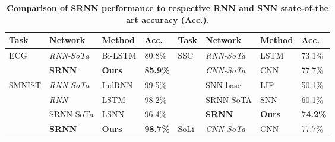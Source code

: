 \documentclass[fleqn,10pt]{wlscirep}
\begin{document}
\begin{table}[]
\centering
\caption{\textbf{Comparison of SRNN performance to respective RNN and SNN state-of-the art accuracy (Acc.).}}
\begin{tabular}{|l|l|l|l|l|l|l|l|}
\hline
Task                     & Network                                & Method                                          & Acc.                                  & Task                   & Network                                                       & Method                                                    & Acc.                                                     \\ \hline
\multirow{2}{*}{ECG}     & \em RNN-SoTa            & Bi-LSTM                                         & 80.8\%                                   & \multirow{5}{*}{SSC}   & \em  RNN-SoTa                                  & LSTM\cite{cramer2019heidelberg}          & 73.1\%                                                       \\ \cline{2-4} \cline{6-8} 
                         & \cellcolor{green}\bf SRNN & \cellcolor{green}\bf Ours          & \cellcolor{green}\bf 85.9\%  &                        & \em CNN-SoTa                                   & CNN\cite{cramer2019heidelberg}           & 77.7\%                                                       \\ \cline{1-4} \cline{6-8} 
\multirow{4}{*}{SMNIST}  & \em RNN-SoTa            & IndRNN\cite{li2018independently}        & 99.5\%                                   &                        & SNN-base                                                      & LIF \cite{cramer2019heidelberg}          & 50.1\%                                                      \\ \cline{2-4} \cline{6-8} 
                         & \em RNN                 & LSTM\cite{arjovsky2016unitary} & 98.2\%                                    &                        & SRNN-SoTA                        &      SNN\cite{perez2021neural}               & 60.1\%                      \\ \cline{2-4} \cline{6-8} 
                         & SRNN-SoTa                              & LSNN\cite{bellec2018long}      & 96.4\%                                    &                        &\cellcolor{green}\bf SRNN                        & \cellcolor{green}\bf Ours                    & \cellcolor{green}\bf 74.2\%                                                              \\ \cline{2-8} 
                         & \cellcolor{green}\bf SRNN & \cellcolor{green}\bf Ours          & \cellcolor{green}\bf 98.7\% & \multirow{3}{*}{SoLi}  & \em CNN-SoTa                                   & CNN\cite{wang2016interacting}            & 77.7\%                                                      \\ \cline{1-4} \cline{6-8} 

\end{tabular}
\end{table}
\end{document}

